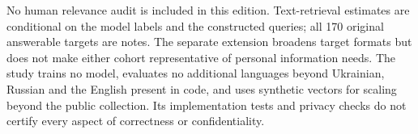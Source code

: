 No human relevance audit is included in this edition. Text-retrieval estimates are conditional on the model labels and the constructed queries; all 170 original answerable targets are notes. The separate extension broadens target formats but does not make either cohort representative of personal information needs. The study trains no model, evaluates no additional languages beyond Ukrainian, Russian and the English present in code, and uses synthetic vectors for scaling beyond the public collection. Its implementation tests and privacy checks do not certify every aspect of correctness or confidentiality.
